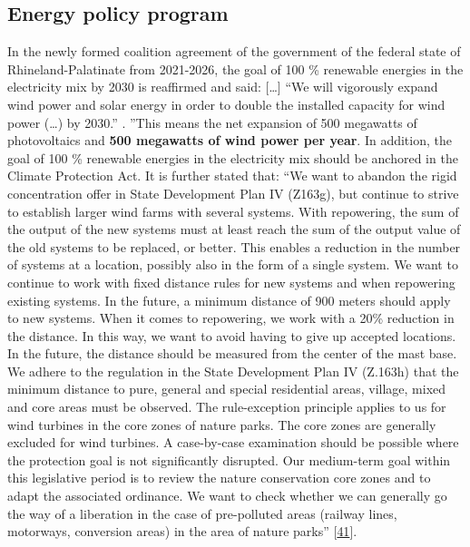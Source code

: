\documentclass[a4paper,11pt]{article}
\begin{document}
\hypertarget{energy-policy-program}{%
\subsection{Energy policy program}\label{energy-policy-program}}

In the newly formed coalition agreement of the government of the federal state of Rhineland-Palatinate from 2021-2026, the goal of 100 \% renewable energies in the electricity mix by 2030 is reaffirmed and said: {[}\ldots{]} ``We will vigorously expand wind power and solar energy in order to double the installed capacity for wind power (\ldots) by 2030.'' . ''This means the net expansion of 500 megawatts of photovoltaics and \textbf{500 megawatts of wind power per year}. In addition, the goal of 100 \% renewable energies in the electricity mix should be anchored in the Climate Protection Act. It is further stated that:
``We want to abandon the rigid concentration offer in State Development Plan IV (Z163g), but continue to strive to establish larger wind farms with several systems. With repowering, the sum of the output of the new systems must at least reach the sum of the output value of the old systems to be replaced, or better. This enables a reduction in the number of systems at a location, possibly also in the form of a single system. We want to continue to work with fixed distance rules for new systems and when repowering existing systems. In the future, a minimum distance of 900 meters should apply to new systems. When it comes to repowering, we work with a 20\% reduction in the distance. In this way, we want to avoid having to give up accepted locations. In the future, the distance should be measured from the center of the mast base. We adhere to the regulation in the State Development Plan IV (Z.163h) that the minimum distance to pure, general and special residential areas, village, mixed and core areas must be observed. The rule-exception principle applies to us for wind turbines in the core zones of nature parks. The core zones are generally excluded for wind turbines. A case-by-case examination should be possible where the protection goal is not significantly disrupted. Our medium-term goal within this legislative period is to review the nature conservation core zones and to adapt the associated ordinance. We want to check whether we can generally go the way of a liberation in the case of pre-polluted areas (railway lines, motorways, conversion areas) in the area of nature parks'' {[}\protect\hyperlink{ref-SPD.2021}{41}{]}.
\end{document}
